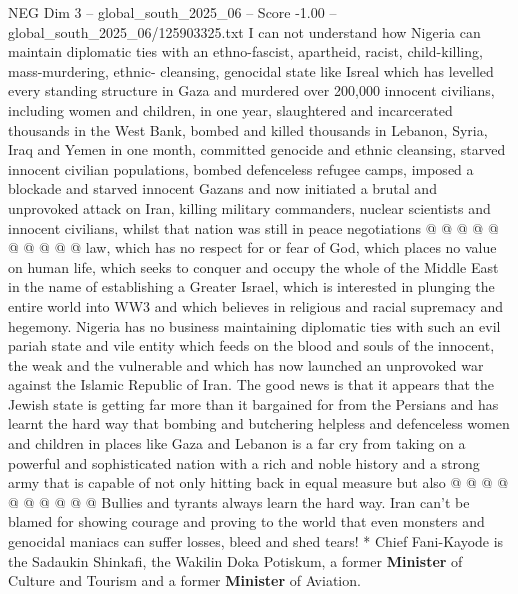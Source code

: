 \begin{textsample}{NEG Dim 3 – global\_south\_2025\_06 – Score -1.00 – global\_south\_2025\_06/125903325.txt}
I can not understand how Nigeria can maintain diplomatic ties with an ethno-fascist, apartheid, racist, child-killing, mass-murdering, ethnic- cleansing, genocidal state like Isreal which has levelled every standing structure in Gaza and murdered over 200,000 innocent civilians, including women and children, in one year, slaughtered and incarcerated thousands in the West Bank, bombed and killed thousands in Lebanon, Syria, Iraq and Yemen in one month, committed genocide and ethnic cleansing, starved innocent civilian populations, bombed defenceless refugee camps, imposed a blockade and starved innocent Gazans and now initiated a brutal and unprovoked attack on Iran, killing military commanders, nuclear scientists and innocent civilians, whilst that nation was still in peace negotiations @ @ @ @ @ @ @ @ @ @ law, which has no respect for or fear of God, which places no value on human life, which seeks to conquer and occupy the whole of the Middle East in the name of establishing a Greater Israel, which is interested in plunging the entire world into WW3 and which believes in religious and racial supremacy and hegemony.
Nigeria has no business maintaining diplomatic ties with such an evil pariah state and vile entity which feeds on the blood and souls of the innocent, the weak and the vulnerable and which has now launched an unprovoked war against the Islamic Republic of Iran.
The good news is that it appears that the Jewish state is getting far more than it bargained for from the Persians and has learnt the hard way that bombing and butchering helpless and defenceless women and children in places like Gaza and Lebanon is a far cry from taking on a powerful and sophisticated nation with a rich and noble history and a strong army that is capable of not only hitting back in equal measure but also @ @ @ @ @ @ @ @ @ @ Bullies and tyrants always learn the hard way.
Iran can't be blamed for showing courage and proving to the world that even monsters and genocidal maniacs can suffer losses, bleed and shed tears! * Chief Fani-Kayode is the Sadaukin Shinkafi, the Wakilin Doka Potiskum, a former \textbf{Minister} of Culture and Tourism and a former \textbf{Minister} of Aviation.

\end{textsample}

